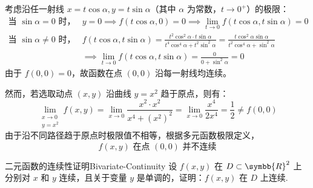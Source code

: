 \begin{myproof}
    考虑沿任一射线 $x = t \cos \alpha, y = t \sin \alpha$（其中 $\alpha$ 为常数，$t \to 0^{+}$）的极限：
    \begin{equation}
        \begin{aligned}
            \text{当 } \sin \alpha = 0 \text{ 时，}    & y = 0 \implies f(t \cos \alpha, 0) = 0 \implies \lim_{t \to 0} f(t \cos \alpha, t \sin \alpha) = 0                                                                                            \\
            \text{当 } \sin \alpha \neq 0 \text{ 时，} & f(t \cos \alpha, t \sin \alpha) = \frac{t^2 \cos^2 \alpha \cdot t \sin \alpha}{t^4 \cos^4 \alpha + t^2 \sin^2 \alpha} = \frac{t \cos^2 \alpha \sin \alpha}{t^2 \cos^4 \alpha + \sin^2 \alpha} \\
                                                    & \implies \lim_{t \to 0} f(t \cos \alpha, t \sin \alpha) = \frac{0}{0 + \sin^2 \alpha} = 0
        \end{aligned}
    \end{equation}
    由于 $f(0,0) = 0$，故函数在点 $(0,0)$ 沿每一射线均连续。

    然而，若选取动点 $(x, y)$ 沿曲线 $y = x^2$ 趋于原点，则有：
    \begin{equation}
        \lim_{\substack{x \to 0 \\ y = x^2}} f(x, y) = \lim_{x \to 0} \frac{x^2 \cdot x^2}{x^4 + (x^2)^2} = \lim_{x \to 0} \frac{x^4}{2x^4} = \frac{1}{2} \neq f(0,0)
    \end{equation}
    由于沿不同路径趋于原点时极限值不相等，根据多元函数极限定义，
    \begin{equation}
        \boxed{f(x, y) \text{ 在点 } (0,0) \text{ 并不连续}}
    \end{equation}
\end{myproof}

\begin{problem}{二元函数的连续性证明}{Bivariate-Continuity}
    设 $f(x,y)$ 在 $D \subset \symbb{R}^2$ 上分别对 $x$ 和 $y$ 连续，且关于变量 $y$ 是单调的，证明：$f(x,y)$ 在 $D$ 上连续.
\end{problem}

